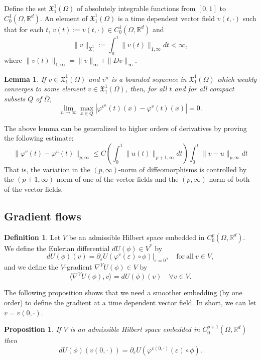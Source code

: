 \documentclass[a5paper,11pt,twoside]{article}
\theoremstyle{plain}
\newtheorem{prop}[teo]{Proposition}
\newtheorem{lem}[teo]{Lemma}
\newcommand{\R}{\ensuremath{\mathbb{R}}}
\newcommand{\X}{\ensuremath{\mathfrak{X}}}
\theoremstyle{definition}
\newtheorem{defin}[teo]{Definition}
\begin{document}
Define the set $\X_1^1(\Omega)$ of absolutely integrable functions from $[0,1]$ to $C_0^1(\Omega,\R^d)$. An element of $\X_1^1(\Omega)$ is a time dependent vector field $v(t,\cdot)$ such that for each $t$, $v(t):=v(t,\cdot)\in C_0^1(\Omega,\R^d)$ and
\[
\|v\|_{\X_1^1}:=\int_0^1\|v(t)\|_{1,\infty}dt<\infty,
\]
where $\|v(t)\|_{1,\infty}=\|v\|_\infty+\|Dv\|_\infty$.

\begin{lem}
If $v\in\X_1^1(\Omega)$ and $v^n$ is a bounded sequence in $\X_1^1(\Omega)$ which weakly converges to some element $v\in\X_1^1(\Omega)$, then, for all $t$ and for all compact subsets $Q$ of $\overline{\Omega}$,
\[
\lim_{n\to\infty}\max_{x\in Q}\left|\varphi^{v^n}(t)(x)-\varphi^{v}(t)(x)\right|=0.
\]
\end{lem}

The above lemma can be generalized to higher orders of derivatives by proving the following estimate:
\[
\|\varphi^v(t)-\varphi^{u}(t)\|_{p,\infty}\leq C\left(\int_0^1\|u(t)\|_{p+1,\infty}dt\right)\int_0^t\|v-u\|_{p,\infty} dt
\]
That is, the variation in the $(p,\infty)$-norm of diffeomorphisms is controlled by the $(p+1,\infty)$-norm of one of the vector fields and the $(p,\infty)$-norm of both of the vector fields.


\subsection{Gradient flows}
\begin{defin}
	Let $V$ be an admissible Hilbert space embedded in $C_0^p(\Omega,\R^d)$. We define the Eulerian differential $dU(\phi)\in V^*$ by
	\[
	dU(\phi)(v)=\partial_\varepsilon U(\varphi^v(\varepsilon)\circ \phi)|_{\varepsilon=0},\quad\mathrm{for\ all\ } v\in V,
	\]
	and we define the $V$-gradient $\nabla^VU(\phi)\in V$ by
	\[
	\langle \nabla^VU(\phi),v\rangle =dU(\phi)(v)\quad\forall v\in V.
	\]
\end{defin}

The following proposition shows that we need a smoother embedding (by one order) to define the gradient at a time dependent vector field. In short, we can let $v=v(0,\cdot)$.

\begin{prop}
	If $V$ is an admissible Hilbert space embedded in $C_0^{p+1}(\Omega,\R^d)$ then $$dU(\phi)(v(0,\cdot))=\partial_\varepsilon U(\varphi^{v(0,\cdot)}(\varepsilon)\circ \phi).$$
\end{prop}
\end{document}
